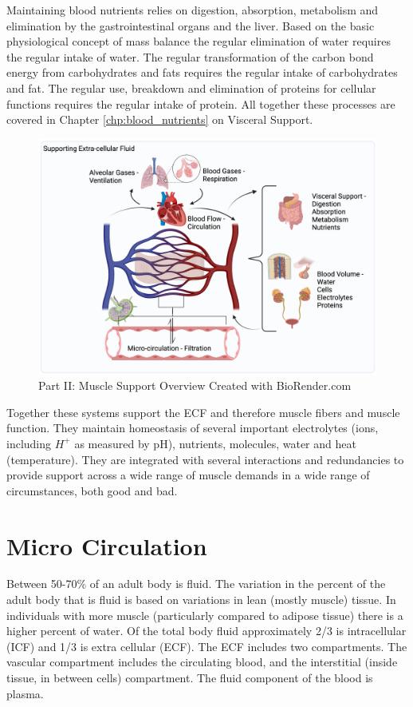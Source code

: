 Maintaining blood nutrients relies on digestion, absorption, metabolism and elimination by the gastrointestinal organs and the liver. Based on the basic physiological concept of mass balance the regular elimination of water requires the regular intake of water. The regular transformation of the carbon bond energy from carbohydrates and fats requires the regular intake of carbohydrates and fat. The regular use, breakdown and elimination of proteins for cellular functions requires the regular intake of protein. All together these processes are covered in Chapter \ref{chp:blood_nutrients} on Visceral Support.

\begin{figure}[!h]
    \centering
    \includegraphics[width=1\linewidth]{./figure/part2_overview.png}
    \caption{Part II: Muscle Support Overview \footnotesize{Created with BioRender.com}}
    \label{fig:part2_overview}
\end{figure}

Together these systems support the ECF and therefore muscle fibers and muscle function. They maintain homeostasis of several important electrolytes (ions, including $H^+$ as measured by pH), nutrients, molecules, water and heat (temperature). They are integrated with several interactions and redundancies to provide support across a wide range of muscle demands in a wide range of circumstances, both good and bad.

\section{Micro Circulation}

Between 50-70\% of an adult body is fluid. The variation in the percent of the adult body that is fluid is based on variations in lean (mostly muscle) tissue. In individuals with more muscle (particularly compared to adipose tissue) there is a higher percent of water. Of the total body fluid approximately 2/3 is intracellular (ICF) and 1/3 is extra cellular (ECF). The ECF includes two compartments. The vascular compartment includes the circulating blood, and the interstitial (inside tissue, in between cells) compartment. The fluid component of the blood is plasma. 

